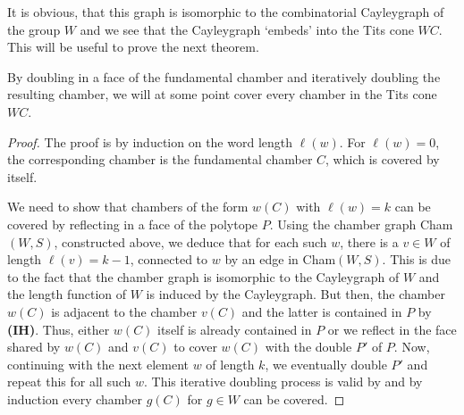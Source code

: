 It is obvious, that this graph is isomorphic to the combinatorial Cayleygraph of the group \(W\) and we see that the Cayleygraph `embeds' into the Tits cone \(WC\).
This will be useful to prove the next theorem.

\begin{theorem}
    By doubling in a face of the fundamental chamber and iteratively doubling the resulting chamber, we will at some point cover every chamber in the Tits cone \(WC\).
\end{theorem}
\begin{proof}
    The proof is by induction on the word length \(\ell(w)\).
    For \(\ell(w) = 0\), the corresponding chamber is the fundamental chamber \(C\), which is covered by itself.
    \par\noindent
    We need to show that chambers of the form \(w(C)\) with \(\ell(w) = k\) can be covered by reflecting in a face of the polytope \(P\).
    Using the chamber graph Cham\((W, S)\), constructed above, we deduce that for each such \(w\), there is a \(v \in W\) of length \(\ell(v) = k - 1\), connected to \(w\) by an edge in Cham\((W, S)\). %
    This is due to the fact that the chamber graph is isomorphic to the Cayleygraph of  \(W\) and the length function of \(W\) is induced by the Cayleygraph.
    But then, the chamber \(w(C)\) is adjacent to the chamber \(v(C)\) and the latter is contained in \(P\) by \textbf{(IH)}.
    Thus, either \(w(C)\) itself is already contained in \(P\) or we reflect in the face shared by \(w(C)\) and \(v(C)\) to cover \(w(C)\) with the double \(P'\) of \(P\).
    Now, continuing with the next element \(w\) of length \(k\), we eventually double \(P'\) and repeat this for all such \(w\).
    This iterative doubling process is valid by  and by induction every chamber \(g(C)\) for \(g \in W\) can be covered.
\end{proof}


